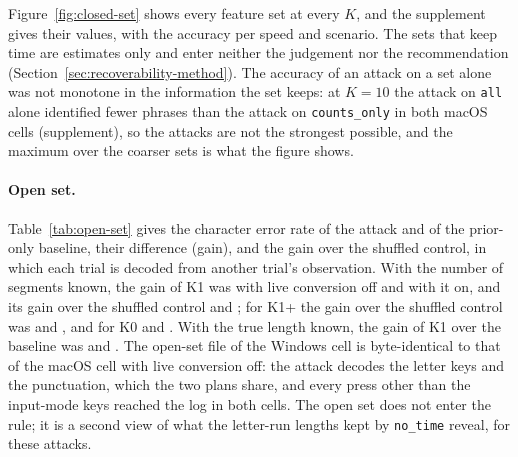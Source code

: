 Figure~\ref{fig:closed-set} shows every feature set at every $K$, and the supplement gives their values, with the
accuracy per speed and scenario. The sets that keep time are estimates only and enter neither the judgement nor the
recommendation (Section~\ref{sec:recoverability-method}). The accuracy of an attack on a set alone was not monotone in
the information the set keeps: at $K = 10$ the attack on \texttt{all} alone identified fewer phrases than the attack on
\texttt{counts\_only} in both macOS cells (supplement), so the attacks are not the strongest possible, and the maximum
over the coarser sets is what the figure shows.

\paragraph{Open set.} Table~\ref{tab:open-set} gives the character error rate of the attack and of the prior-only
baseline, their difference (gain), and the gain over the shuffled control, in which each trial is decoded from another
trial's observation. With the number of segments known, the gain of K1 was
 with live conversion off and
 with it on, and its gain over the shuffled control
 and
; for K1+ the gain over the shuffled control was
 and
, and for K0
 and
. With the true length known, the gain of K1 over the
baseline was  and . The
open-set file of the Windows cell is byte-identical to that of the macOS cell with live conversion off: the attack
decodes the letter keys and the punctuation, which the two plans share, and every press other than the input-mode keys
reached the log in both cells. The open set does not enter the rule; it is a second view of what the letter-run lengths
kept by \texttt{no\_time} reveal, for these attacks.





